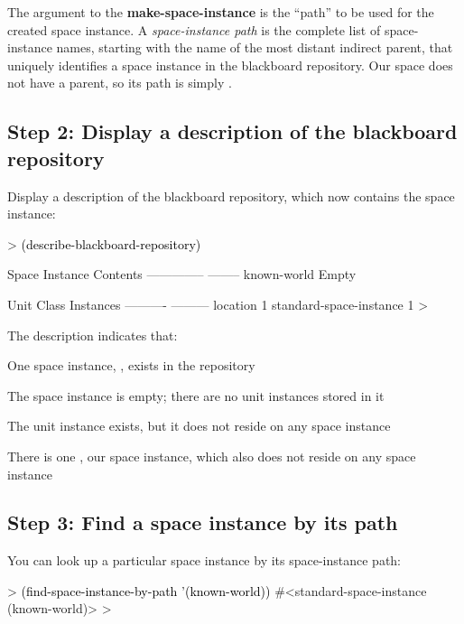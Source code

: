 \documentclass[10pt,twoside,english,pdftex]{article}
\begin{document}
The argument to the \textbf{make-space-instance} is the ``path'' to be used
for the created space instance.  A \textit{space-instance path} is the
complete list of space-instance names, starting with the name of the most
distant indirect parent, that uniquely identifies a space instance in the
blackboard repository.  Our  space does not have a parent,
so its path is simply .

\subsection*{Step 2: Display a description of the blackboard repository}

%
%
Display a description of the blackboard repository, which now contains the
 space instance:
%
\begin{example}\color{darkergray}%
  > \textcolor{black}{(describe-blackboard-repository)}
  
  Space Instance                Contents
  --------------                --------
  known-world                   Empty

  Unit Class                    Instances
  ----------                    ---------
  location                              1
  standard-space-instance               1
  >
\end{example}

The description indicates that:
\begin{tightitemize}
\item One space instance, , exists in the repository
\item The  space instance is empty; there are no unit
  instances stored in it
\item The  unit instance exists, but it does not reside
  on any space instance
\item There is one , our
   space instance, which also does not reside
  on any space instance
\end{tightitemize}
 
\subsection*{Step 3: Find a space instance by its path}

%
%
You can look up a particular space instance by its space-instance path:
%
\begin{example}\color{darkergray}%
  > \textcolor{black}{(find-space-instance-by-path '(known-world))}
  #<standard-space-instance (known-world)>
  >
\end{example}
\end{document}
